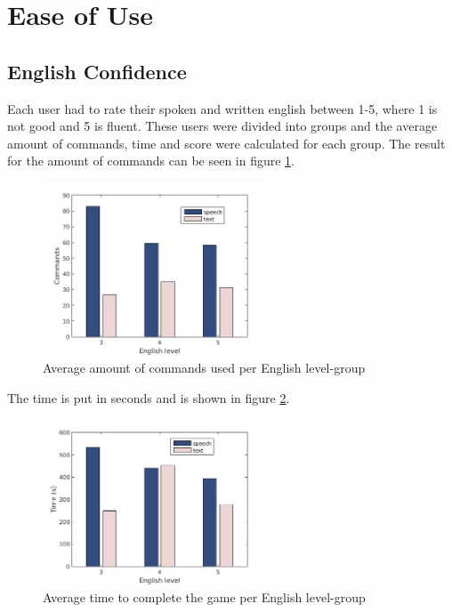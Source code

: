 \section{Ease of Use}

\subsection{English Confidence} \label{sec:eng_con}
Each user had to rate their spoken and written english between 1-5, where 1 is not good and 5 is fluent. These users were divided into groups and the average amount of commands, time and score were calculated for each group. The result for the amount of commands can be seen in figure \ref{eng_cmd}. 

\begin{figure}[ht]
  \centering
  \includegraphics[width=0.6\textwidth]{images/english_cmd.jpg}
  \caption{Average amount of commands used per English level-group}\label{eng_cmd}
\end{figure}

The time is put in seconds and is shown in figure \ref{eng_time}.

\begin{figure}[ht]
  \centering
  \includegraphics[width=0.6\textwidth]{images/english_time.jpg}
  \caption{Average time to complete the game per English level-group}\label{eng_time}
\end{figure}

